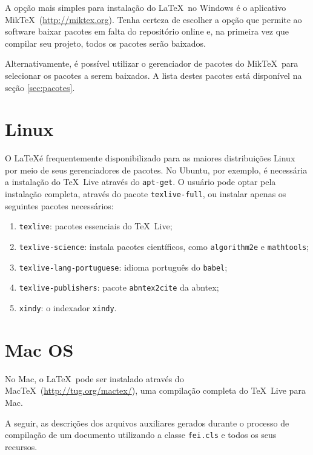 \documentclass{fei}
\begin{document}
	A opção mais simples para instalação do \LaTeX\ no Windows é o aplicativo Mik\TeX\ (\url{http://miktex.org}). Tenha certeza de escolher a opção que permite ao software baixar pacotes em falta do repositório online e, na primeira vez que compilar seu projeto, todos os pacotes serão baixados.
	
	Alternativamente, é possível utilizar o gerenciador de pacotes do Mik\TeX\ para selecionar os pacotes a serem baixados. A lista destes pacotes está disponível na seção \ref{sec:pacotes}.
	
	\section{Linux}
	
	O \LaTeX é frequentemente disponibilizado para as maiores distribuições Linux por meio de seus gerenciadores de pacotes. No Ubuntu, por exemplo, é necessária a instalação do \TeX\ Live através do \texttt{apt-get}. O usuário pode optar pela instalação completa, através do pacote \texttt{texlive-full}, ou instalar apenas os seguintes pacotes necessários:
	
	\begin{enumerate}
	\item \texttt{texlive}: pacotes essenciais do \TeX\ Live;
	\item \texttt{texlive-science}: instala pacotes científicos, como \texttt{algorithm2e} e \texttt{mathtools};
	\item \texttt{texlive-lang-portuguese}: idioma português do \texttt{babel};
	\item \texttt{texlive-publishers}: pacote \texttt{abntex2cite} da \gls{abntex};
	\item {}\texttt{xindy}: o indexador \texttt{xindy}.
	\end{enumerate}

	\section{Mac OS}
	
	No Mac, o \LaTeX\ pode ser instalado através do Mac\TeX\ (\url{http://tug.org/mactex/}), uma compilação completa do \TeX\ Live para Mac.

	
	
	A seguir, as descrições dos arquivos auxiliares gerados durante o processo de compilação de um documento utilizando a classe \texttt{fei.cls} e todos os seus recursos.
		
\end{document}
